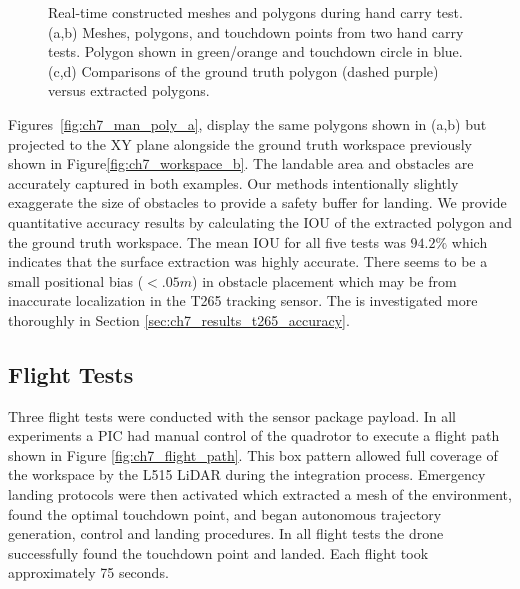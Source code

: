 \begin{figure}[!htb]
\begin{subfigure}[t]{.33\linewidth}
    \caption{\label{fig:ch7_man_poly_b}}
  \end{subfigure}
   \caption[Real-time constructed meshes and polygons during hand carry test]{Real-time constructed meshes and polygons during hand carry test. (a,b) Meshes, polygons, and touchdown points from two hand carry tests. Polygon shown in green/orange and touchdown circle in blue. (c,d) Comparisons of the ground truth polygon (dashed purple) versus extracted polygons.} \label{fig:ch7_mesh_handcarry}
\end{figure}

Figures~\ref{fig:ch7_man_poly_a}, display the same polygons shown in (a,b) but projected to the XY plane alongside the ground truth workspace previously shown in Figure\ref{fig:ch7_workspace_b}. The landable area and obstacles are accurately captured in both examples. Our methods intentionally slightly exaggerate the size of obstacles to provide a safety buffer for landing.  We provide quantitative accuracy results by calculating the \ac{IOU} of the extracted polygon and the ground truth workspace.  The mean \ac{IOU} for all five tests was $94.2\%$ which indicates that the surface extraction was highly accurate. There seems to be a small positional bias ($< .05m$) in obstacle placement which may be from inaccurate localization in the T265 tracking sensor. The is investigated more thoroughly in Section \ref{sec:ch7_results_t265_accuracy}.


\subsection{Flight Tests} \label{sec:ch7_results_flight}

Three flight tests were conducted with the sensor package payload. In all experiments a \ac{PIC} had manual control of the quadrotor to execute a flight path shown in Figure \ref{fig:ch7_flight_path}. This box pattern allowed full coverage of the workspace by the L515 LiDAR during the integration process. Emergency landing protocols were then activated which extracted a mesh of the environment, found the optimal touchdown point, and began autonomous trajectory generation, control and landing procedures. In all flight tests the drone successfully found the touchdown point and landed. Each flight took approximately 75 seconds.

